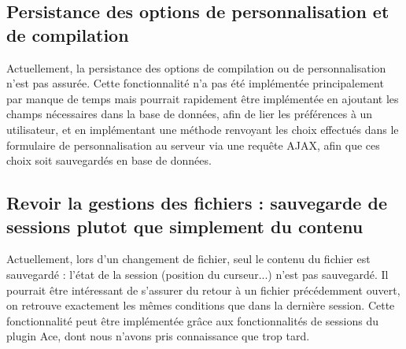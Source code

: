 \subsection{Persistance des options de personnalisation et de compilation}

\par Actuellement, la persistance des options de compilation ou de personnalisation n'est pas assurée. Cette fonctionnalité n'a pas été implémentée principalement par manque de temps mais pourrait rapidement être implémentée en ajoutant les champs nécessaires dans la base de données, afin de lier les préférences à un utilisateur, et en implémentant une méthode renvoyant les choix effectués dans le formulaire de personnalisation au serveur via une requête AJAX, afin que ces choix soit sauvegardés en base de données.

\subsection{Revoir la gestions des fichiers : sauvegarde de sessions plutot que simplement du contenu}
\par Actuellement, lors d'un changement de fichier, seul le contenu du fichier est sauvegardé : l'état de la session (position du curseur...) n'est pas sauvegardé. Il pourrait être intéressant de s'assurer du retour à un fichier précédemment ouvert, on retrouve exactement les mêmes conditions que dans la dernière session. Cette fonctionnalité peut être implémentée grâce aux fonctionnalités de sessions du plugin Ace, dont nous n'avons pris connaissance que trop tard.